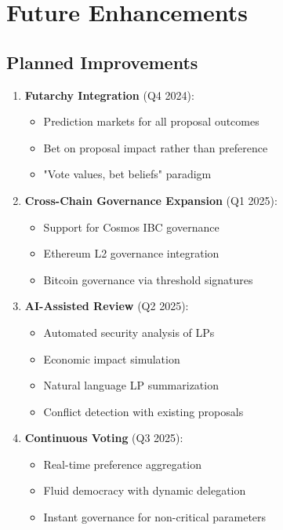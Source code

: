 \documentclass[11pt,a4paper]{article}
\begin{document}
\section{Future Enhancements}

\subsection{Planned Improvements}

\begin{enumerate}
\item \textbf{Futarchy Integration} (Q4 2024):
\begin{itemize}
\item Prediction markets for all proposal outcomes
\item Bet on proposal impact rather than preference
\item "Vote values, bet beliefs" paradigm
\end{itemize}

\item \textbf{Cross-Chain Governance Expansion} (Q1 2025):
\begin{itemize}
\item Support for Cosmos IBC governance
\item Ethereum L2 governance integration
\item Bitcoin governance via threshold signatures
\end{itemize}

\item \textbf{AI-Assisted Review} (Q2 2025):
\begin{itemize}
\item Automated security analysis of LPs
\item Economic impact simulation
\item Natural language LP summarization
\item Conflict detection with existing proposals
\end{itemize}

\item \textbf{Continuous Voting} (Q3 2025):
\begin{itemize}
\item Real-time preference aggregation
\item Fluid democracy with dynamic delegation
\item Instant governance for non-critical parameters
\end{itemize}
\end{enumerate}
\end{document}
